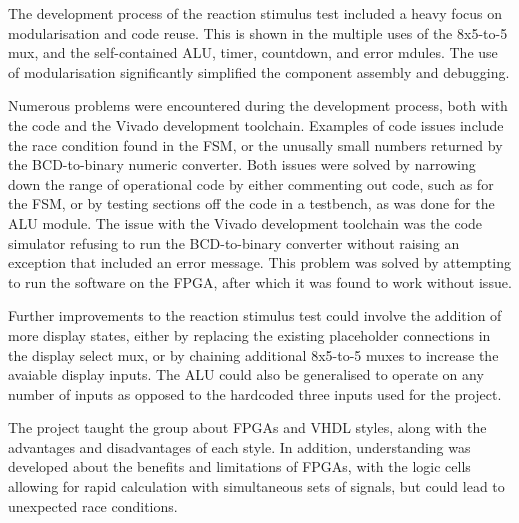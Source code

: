 \documentclass[11pt]{article}
\begin{document}
The development process of the reaction stimulus test included a heavy focus on modularisation and code reuse. This is shown in the multiple uses of the 8x5-to-5 mux, and the self-contained ALU, timer, countdown, and error mdules. The use of modularisation significantly simplified the component assembly and debugging.

Numerous problems were encountered during the development process, both with the code and the Vivado development toolchain. Examples of code issues include the race condition found in the FSM, or the unusally small numbers returned by the BCD-to-binary numeric converter. Both issues were solved by narrowing down the range of operational code by either commenting out code, such as for the FSM, or by testing sections off the code in a testbench, as was done for the ALU module. The issue with the Vivado development toolchain was the code simulator refusing to run the BCD-to-binary converter without raising an exception that included an error message. This problem was solved by attempting to run the software on the FPGA, after which it was found to work without issue.

Further improvements to the reaction stimulus test could involve the addition of more display states, either by replacing the existing placeholder connections in the display select mux, or by chaining additional 8x5-to-5 muxes to increase the avaiable display inputs. The ALU could also be generalised to operate on any number of inputs as opposed to the hardcoded three inputs used for the project.

The project taught the group about FPGAs and VHDL styles, along with the advantages and disadvantages of each style. In addition, understanding was developed about the benefits and limitations of FPGAs, with the logic cells allowing for rapid calculation with simultaneous sets of signals, but could lead to unexpected race conditions.
\end{document}
